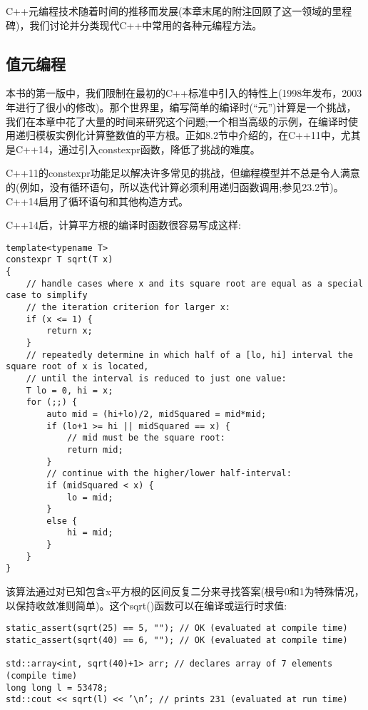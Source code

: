 
C++元编程技术随着时间的推移而发展(本章末尾的附注回顾了这一领域的里程碑)，我们讨论并分类现代C++中常用的各种元编程方法。

\subsection{值元编程}

本书的第一版中，我们限制在最初的C++标准中引入的特性上(1998年发布，2003年进行了很小的修改)。那个世界里，编写简单的编译时(“元”)计算是一个挑战，我们在本章中花了大量的时间来研究这个问题;一个相当高级的示例，在编译时使用递归模板实例化计算整数值的平方根。正如8.2节中介绍的，在C++11中，尤其是C++14，通过引入constexpr函数，降低了挑战的难度。

\begin{tcolorbox}[colback=webgreen!5!white,colframe=webgreen!75!black]
\hspace*{0.75cm}C++11的constexpr功能足以解决许多常见的挑战，但编程模型并不总是令人满意的(例如，没有循环语句，所以迭代计算必须利用递归函数调用;参见23.2节)。C++14启用了循环语句和其他构造方式。
\end{tcolorbox}

C++14后，计算平方根的编译时函数很容易写成这样:

\begin{lstlisting}[style=styleCXX]
template<typename T>
constexpr T sqrt(T x)
{
	// handle cases where x and its square root are equal as a special case to simplify
	// the iteration criterion for larger x:
	if (x <= 1) {
		return x;
	}
	// repeatedly determine in which half of a [lo, hi] interval the square root of x is located,
	// until the interval is reduced to just one value:
	T lo = 0, hi = x;
	for (;;) {
		auto mid = (hi+lo)/2, midSquared = mid*mid;
		if (lo+1 >= hi || midSquared == x) {
			// mid must be the square root:
			return mid;
		}
		// continue with the higher/lower half-interval:
		if (midSquared < x) {
			lo = mid;
		}
		else {
			hi = mid;
		}
	}
}
\end{lstlisting}

该算法通过对已知包含x平方根的区间反复二分来寻找答案(根号0和1为特殊情况，以保持收敛准则简单)。这个sqrt()函数可以在编译或运行时求值:

\begin{lstlisting}[style=styleCXX]
static_assert(sqrt(25) == 5, ""); // OK (evaluated at compile time)
static_assert(sqrt(40) == 6, ""); // OK (evaluated at compile time)

std::array<int, sqrt(40)+1> arr; // declares array of 7 elements (compile time)
long long l = 53478;
std::cout << sqrt(l) << ’\n’; // prints 231 (evaluated at run time)
\end{lstlisting}

